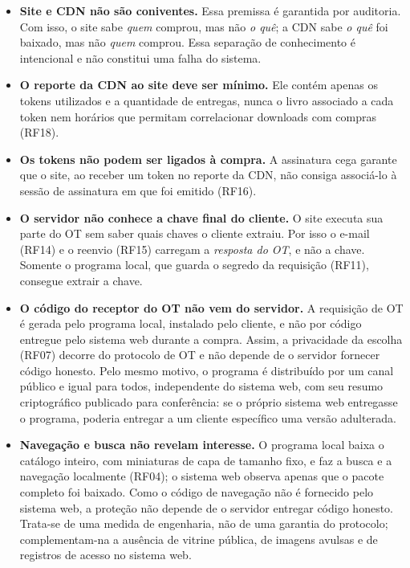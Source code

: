 \begin{itemize}
\item \textbf{Site e CDN não são coniventes.} Essa premissa é garantida por
auditoria. Com isso, o site sabe \emph{quem} comprou, mas não \emph{o quê}; a
CDN sabe \emph{o quê} foi baixado, mas não \emph{quem} comprou. Essa separação
de conhecimento é intencional e não constitui uma falha do sistema.

\item \textbf{O reporte da CDN ao site deve ser mínimo.} Ele contém apenas os
tokens utilizados e a quantidade de entregas, nunca o livro associado a cada
token nem horários que permitam correlacionar downloads com compras (RF18).

\item \textbf{Os tokens não podem ser ligados à compra.} A assinatura cega
garante que o site, ao receber um token no reporte da CDN, não consiga
associá-lo à sessão de assinatura em que foi emitido (RF16).

\item \textbf{O servidor não conhece a chave final do cliente.} O site executa
sua parte do OT sem saber quais chaves o cliente extraiu. Por isso o e-mail
(RF14) e o reenvio (RF15) carregam a \emph{resposta do OT}, e não a chave.
Somente o programa local, que guarda o segredo da requisição (RF11), consegue
extrair a chave.

\item \textbf{O código do receptor do OT não vem do servidor.} A requisição de
OT é gerada pelo programa local, instalado pelo cliente, e não por código
entregue pelo sistema web durante a compra. Assim, a privacidade da escolha
(RF07) decorre do protocolo de OT e não depende de o servidor fornecer código
honesto. Pelo mesmo motivo, o programa é distribuído por um canal público e
igual para todos, independente do sistema web, com seu resumo criptográfico
publicado para conferência: se o próprio sistema web entregasse o programa,
poderia entregar a um cliente específico uma versão adulterada.

\item \textbf{Navegação e busca não revelam interesse.} O programa local
baixa o catálogo inteiro, com miniaturas de capa de tamanho fixo, e faz a
busca e a navegação localmente (RF04); o sistema web observa apenas que o
pacote completo foi baixado. Como o código de navegação não é fornecido pelo
sistema web, a proteção não depende de o servidor entregar código honesto.
Trata-se de uma medida de engenharia, não de uma garantia do protocolo;
complementam-na a ausência de vitrine pública, de imagens avulsas e de
registros de acesso no sistema web.


\end{itemize}
